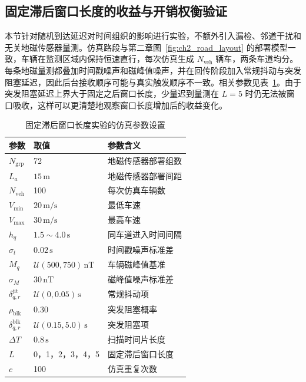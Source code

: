 \documentclass{xdupgthesis}
\begin{document}
\subsection{固定滞后窗口长度的收益与开销权衡验证}

本节针对随机到达延迟对时间组织的影响进行实验，不额外引入漏检、邻道干扰和无关地磁传感器量测。仿真路段与第二章图~\ref{fig:ch2_road_layout} 的部署模型一致，车辆在监测区域内保持恒速直行，每次仿真生成 $N_{\mathrm{veh}}$ 辆车，两条车道均分。每条地磁量测都叠加时间戳噪声和磁峰值噪声，并在回传阶段加入常规抖动与突发阻塞延迟，因此后台接收顺序可能与真实触发顺序不一致。相关参数见表~\ref{tab:ch3_lag_window_sim}。由于突发阻塞延迟上界大于固定之后窗口长度，少量迟到量测在 $L=5$ 时仍无法被窗口吸收，这样可以更清楚地观察窗口长度增加后的收益变化。

\begin{table}[htbp]
	\centering
	\caption{固定滞后窗口长度实验的仿真参数设置}
	\label{tab:ch3_lag_window_sim}
	\small
	\begin{tabular}{p{2.8cm}p{3.0cm}p{6.0cm}}
		\toprule
		参数 & 取值 & 参数含义 \\
		\midrule
		$N_{\mathrm{grp}}$ & 72 & 地磁传感器部署组数 \\
		$L_a$ & $15\,\mathrm{m}$ & 地磁传感器部署间距 \\
		$N_{\mathrm{veh}}$ & 100 & 每次仿真车辆数 \\
		$V_{\min}$ & $20\,\mathrm{m/s}$ & 最低车速 \\
		$V_{\max}$ & $30\,\mathrm{m/s}$ & 最高车速 \\
		$h_q$ & $1.5\sim4.0\,\mathrm{s}$ & 同车道进入时间间隔 \\
		$\sigma_t$ & $0.02\,\mathrm{s}$ & 时间戳噪声标准差 \\
		$M_q$ & $\mathcal U(500,750)\,\mathrm{nT}$ & 车辆磁峰值基准 \\
		$\sigma_M$ & $30\,\mathrm{nT}$ & 磁峰值噪声标准差 \\
		$\delta_{q,r}^{\mathrm{jit}}$ & $\mathcal U(0,0.05)\,\mathrm{s}$ & 常规抖动项 \\
		$\rho_{\mathrm{blk}}$ & 0.30 & 突发阻塞概率 \\
		$\delta_{q,r}^{\mathrm{blk}}$ & $\mathcal U(0.15,5.0)\,\mathrm{s}$ & 突发阻塞项 \\
		$\Delta T$ & $0.8\,\mathrm{s}$ & 扫描时间片长度 \\
		$L$ & 0，1，2，3，4，5 & 固定滞后窗口长度 \\
		$c$ & 100 & 仿真重复次数 \\
		\bottomrule
	\end{tabular}
\end{table}
\end{document}
